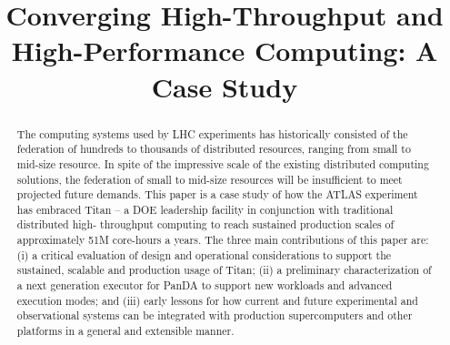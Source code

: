 \documentclass[conference]{IEEEtran}
\begin{document}
\title{Converging High-Throughput and High-Performance Computing: A Case Study}

\author{
}

\maketitle

\begin{abstract}
The computing systems used by LHC experiments has historically consisted of
the federation of hundreds to thousands of distributed resources, ranging from
small to mid-size resource.  In spite of the impressive scale of the existing
distributed computing solutions, the federation of small to mid-size
resources will be insufficient to meet projected future demands.
This paper is a case study of how the ATLAS experiment has embraced Titan -- a
DOE leadership facility in conjunction with traditional distributed high-
throughput computing to reach sustained production scales of approximately 51M
core-hours a years. The three main contributions of this paper are:  (i) a
critical evaluation of design and operational considerations  to support the
sustained, scalable and production usage of Titan;  (ii) a preliminary
characterization of a next generation executor for PanDA to support new
workloads and  advanced execution modes; and (iii) early lessons for how
current and future experimental and observational systems can be integrated
with production supercomputers and other platforms in a general and extensible
manner.
\end{abstract}
\end{document}

